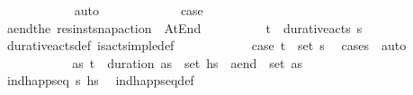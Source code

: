 \begin{isabellebody}
\ \ \ \ \ \ \ \ \ \ \isamarkupfalse%
\ auto\isanewline
\ \ \ \ \isamarkupfalse%
\isanewline
\ \ \ \ \ \ \isamarkupfalse%
\ {\isacharquery}{\kern0pt}case{}\isanewline
\ \ \ \ \ \ \ \ \isamarkupfalse%
\ {\isacharquery}{\kern0pt}a\isactrlsub e\isactrlsub n\isactrlsub d{\isacharequal}{\kern0pt}{\isachardoublequoteopen}the\ {\isacharparenleft}{\kern0pt}res{\isacharunderscore}{\kern0pt}inst{\isacharunderscore}{\kern0pt}snap{\isacharunderscore}{\kern0pt}action\ {\isasympi}\ At{\isacharunderscore}{\kern0pt}End{\isacharparenright}{\kern0pt}{\isachardoublequoteclose}\isanewline
\ \ \ \ \ \ \ \ \isamarkupfalse%
\ {\isachardoublequoteopen}{\isacharparenleft}{\kern0pt}t\isactrlsub {\isasympi}{\isacharcomma}{\kern0pt}{\isasympi}{\isacharparenright}{\kern0pt}\ {\isasymin}\ durative{\isacharunderscore}{\kern0pt}acts\ {\isasympi}s{\isachardoublequoteclose}\isanewline
\ \ \ \ \ \ \ \ \ \ \isamarkupfalse%
\ durative{\isacharunderscore}{\kern0pt}acts{\isacharunderscore}{\kern0pt}def\ is{\isacharunderscore}{\kern0pt}act{\isacharunderscore}{\kern0pt}simple{\isacharunderscore}{\kern0pt}def\isanewline
\ \ \ \ \ \ \ \ \ \ \isamarkupfalse%
\ {\isacartoucheopen}{\isacharquery}{\kern0pt}case{}{\isacartoucheclose}\ {\isacartoucheopen}{\isacharparenleft}{\kern0pt}t\isactrlsub {\isasympi}{\isacharcomma}{\kern0pt}{\isasympi}{\isacharparenright}{\kern0pt}\ {\isasymin}\ set\ {\isasympi}s{\isacartoucheclose}\ \isamarkupfalse%
\ {\isacharparenleft}{\kern0pt}cases\ {\isasympi}{\isacharparenright}{\kern0pt}\ auto\isanewline
\ \ \ \ \ \ \ \ \isamarkupfalse%
\ \isamarkupfalse%
\ {\isachardoublequoteopen}{\isasymexists}as{\isachardot}{\kern0pt}\ {\isacharparenleft}{\kern0pt}t\isactrlsub {\isasympi}\ {\isacharplus}{\kern0pt}\ {\isacharparenleft}{\kern0pt}duration\ {\isasympi}{\isacharparenright}{\kern0pt}{\isacharcomma}{\kern0pt}as{\isacharparenright}{\kern0pt}\ {\isasymin}\ set\ hs\ {\isasymand}\ {\isacharquery}{\kern0pt}a\isactrlsub e\isactrlsub n\isactrlsub d\ {\isasymin}\ set\ as{\isachardoublequoteclose}\isanewline
\ \ \ \ \ \ \ \ \ \ \isamarkupfalse%
\ {\isacartoucheopen}ind{\isacharunderscore}{\kern0pt}happ{\isacharunderscore}{\kern0pt}seq\ {\isasympi}s\ hs\ \isamarkupfalse%
\ ind{\isacharunderscore}{\kern0pt}happ{\isacharunderscore}{\kern0pt}seq{\isacharunderscore}{\kern0pt}def\ \isamarkupfalse%

\end{isabellebody}
